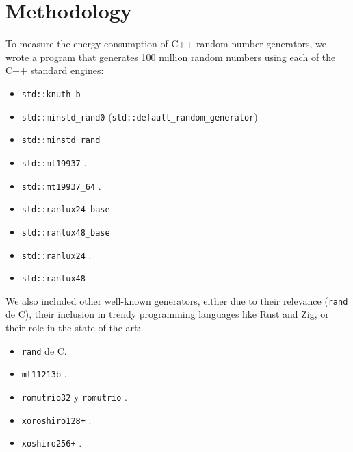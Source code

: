 \documentclass[sigconf]{acmart}
\begin{document}
\section{Methodology}
\label{sec:methodology}

To measure the energy consumption of C++ random number generators, we wrote a program that generates 100 million random numbers using each of the C++ standard engines:
\begin{itemize}
    \item \texttt{std::knuth\_b}
    \item \texttt{std::minstd\_rand0} (\texttt{std::default\_random\_generator})
    \item \texttt{std::minstd\_rand}
    \item \texttt{std::mt19937} \cite{mersennetwister}.
    \item \texttt{std::mt19937\_64} \cite{mersennetwister}.
    \item \texttt{std::ranlux24\_base}
    \item \texttt{std::ranlux48\_base}
    \item \texttt{std::ranlux24} \cite{JAMES1994111}.
    \item \texttt{std::ranlux48} \cite{JAMES1994111}.
\end{itemize}

We also included other well-known generators, either due to their relevance (\texttt{rand} de C), their inclusion in trendy programming languages like Rust and Zig, or their role in the state of the art:

\begin{itemize}
    \item \texttt{rand} de C.
    \item \texttt{mt11213b} \cite{mersennetwister}.
    \item \texttt{romutrio32} y \texttt{romutrio} \cite{overton2020romufastnonlinearpseudorandom}.
    \item \texttt{xoroshiro128+} \cite{blackman2021scrambled}.
    \item \texttt{xoshiro256+} \cite{blackman2021scrambled}.
\end{itemize}
\end{document}
